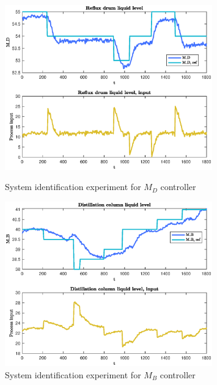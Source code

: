 \documentclass[12pt]{article}
\begin{document}
\begin{figure}[p]
\centering
\includegraphics[width=0.8\textwidth]{../Systemanalyse/Log_Data_to_Matlab/Figurer/Identifisering/MD_eksperiment.eps}
\caption{System identification experiment for $M_D$ controller}
\label{fig:MD_experiment}

\includegraphics[width=0.8\textwidth]{../Systemanalyse/Log_Data_to_Matlab/Figurer/Identifisering/MB_eksperiment.eps}
\caption{System identification experiment for $M_B$ controller}
\label{fig:MB_experiment}
\end{figure}
\end{document}
